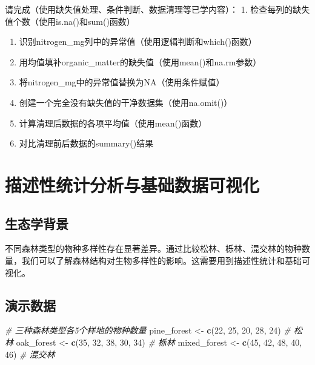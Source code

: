 \documentclass[
  twoside]{book}
\newenvironment{Shaded}{\begin{snugshade}}{\end{snugshade}}
\newcommand{\CommentTok}[1]{\textcolor[rgb]{0.56,0.35,0.01}{\textit{#1}}}
\newcommand{\DecValTok}[1]{\textcolor[rgb]{0.00,0.00,0.81}{#1}}
\newcommand{\FunctionTok}[1]{\textcolor[rgb]{0.13,0.29,0.53}{\textbf{#1}}}
\newcommand{\NormalTok}[1]{#1}
\newcommand{\OtherTok}[1]{\textcolor[rgb]{0.56,0.35,0.01}{#1}}
\begin{document}
请完成（使用缺失值处理、条件判断、数据清理等已学内容）：
1. 检查每列的缺失值个数（使用is.na()和sum()函数）

\begin{enumerate}
\def\labelenumi{\arabic{enumi}.}
\setcounter{enumi}{1}
\item
  识别nitrogen\_mg列中的异常值（使用逻辑判断和which()函数）
\item
  用均值填补organic\_matter的缺失值（使用mean()和na.rm参数）
\item
  将nitrogen\_mg中的异常值替换为NA（使用条件赋值）
\item
  创建一个完全没有缺失值的干净数据集（使用na.omit()）
\item
  计算清理后数据的各项平均值（使用mean()函数）
\item
  对比清理前后数据的summary()结果
\end{enumerate}

\hypertarget{ux63cfux8ff0ux6027ux7edfux8ba1ux5206ux6790ux4e0eux57faux7840ux6570ux636eux53efux89c6ux5316}{%
\section{描述性统计分析与基础数据可视化}\label{ux63cfux8ff0ux6027ux7edfux8ba1ux5206ux6790ux4e0eux57faux7840ux6570ux636eux53efux89c6ux5316}}

\hypertarget{ux751fux6001ux5b66ux80ccux666f-6}{%
\subsection{生态学背景}\label{ux751fux6001ux5b66ux80ccux666f-6}}

不同森林类型的物种多样性存在显著差异。通过比较松林、栎林、混交林的物种数量，我们可以了解森林结构对生物多样性的影响。这需要用到描述性统计和基础可视化。

\hypertarget{ux6f14ux793aux6570ux636e-5}{%
\subsection{演示数据}\label{ux6f14ux793aux6570ux636e-5}}

\begin{Shaded}
\begin{Highlighting}[]
\CommentTok{\# 三种森林类型各5个样地的物种数量}
\NormalTok{pine\_forest }\OtherTok{\textless{}{-}} \FunctionTok{c}\NormalTok{(}\DecValTok{22}\NormalTok{, }\DecValTok{25}\NormalTok{, }\DecValTok{20}\NormalTok{, }\DecValTok{28}\NormalTok{, }\DecValTok{24}\NormalTok{)      }\CommentTok{\# 松林}
\NormalTok{oak\_forest }\OtherTok{\textless{}{-}} \FunctionTok{c}\NormalTok{(}\DecValTok{35}\NormalTok{, }\DecValTok{32}\NormalTok{, }\DecValTok{38}\NormalTok{, }\DecValTok{30}\NormalTok{, }\DecValTok{34}\NormalTok{)       }\CommentTok{\# 栎林  }
\NormalTok{mixed\_forest }\OtherTok{\textless{}{-}} \FunctionTok{c}\NormalTok{(}\DecValTok{45}\NormalTok{, }\DecValTok{42}\NormalTok{, }\DecValTok{48}\NormalTok{, }\DecValTok{40}\NormalTok{, }\DecValTok{46}\NormalTok{)     }\CommentTok{\# 混交林}
\end{Highlighting}
\end{Shaded}
\end{document}
